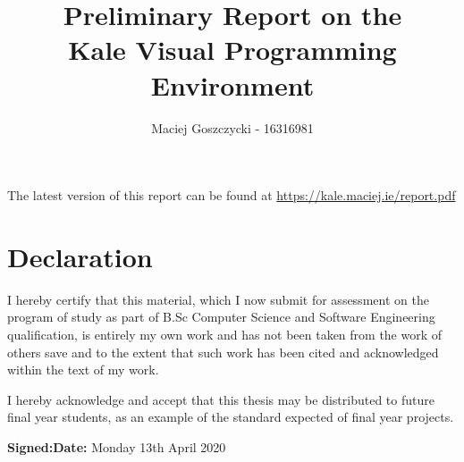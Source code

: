 \documentclass[11pt]{report}
\title{Preliminary Report on the \\ Kale Visual Programming Environment}
\author{Maciej Goszczycki - 16316981}
\date{\versionBox}
\newenvironment{callouttip}[1]{
    \begin{mdframed}[style=titlecallout,
        linecolor=calloutborder, backgroundcolor=calloutbg,
        frametitle={#1}]
}{
	\medskip
    \end{mdframed}
}
\begin{document}



\begin{callouttip}
\normalfont{The latest version of this report can be found at}
\url{https://kale.maciej.ie/report.pdf}
\end{callouttip}
\tableofcontents
\clearpage
\section*{Declaration}
\vspace{0.10\paperheight}
I hereby certify that this material, which I now submit for assessment
on the program of study as part of B.Sc Computer Science and Software
Engineering qualification,
is entirely my own work and has not been taken from the work of others 
save and to the extent that such work has been cited and acknowledged
within the text of my work. 

\vspace{0.10\paperheight}
\noindent I hereby acknowledge and accept that this thesis may be distributed to
future final year students, as an example of the standard expected of
final year projects.
\vspace{0.20\paperheight}

\textbf{Signed:}\hfill \textbf{Date:} Monday 13th April 2020
\clearpage

\setcounter{page}{1}

\setlength\intextsep{0pt}

\DefineShortVerb{\|}



















\renewcommand*{\bibfont}{\raggedright}

\clearpage


\begin{appendices}
	
	
	
\end{appendices}
\end{document}
